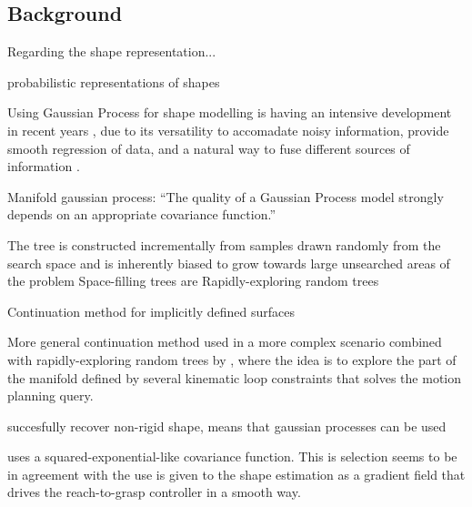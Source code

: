 \subsection{Background}
\label{sec:background}


Regarding the shape representation...

\citet{Faria2010Probabilistic} probabilistic representations of shapes

Using Gaussian Process for shape modelling is having an intensive development in recent years \citep{Mahler2015Grasp,Rosales2014Active,Bjorkman2013Enhancing,Dragiev2011Gaussian}, due to its versatility to accomadate noisy information, provide smooth regression of data, and a natural way to fuse different sources of information \citep{Rasmussen2006Gaussian}.

Manifold gaussian process: \citet{Calandra2014Manifold} ``The quality of a Gaussian Process model strongly depends on an appropriate covariance function.''

The tree is constructed incrementally from samples drawn randomly from the search space and is inherently biased to grow towards large unsearched areas of the problem
Space-filling trees are
Rapidly-exploring random trees \citet{LaValle2011Motion}

Continuation method for implicitly defined surfaces \citet{Henderson1993COMPUTING}

More general continuation method used in a more complex scenario combined with rapidly-exploring random trees \citep{LaValle2011Motion} by \citet{Jaillet2013Path}, where the idea is to explore the part of the manifold defined by several kinematic loop constraints that solves the motion planning query.

\citet{Zhu2009Nonrigid} succesfully recover non-rigid shape, means that gaussian processes can be used

\citet{Dragiev2011Gaussian} uses a squared-exponential-like covariance function. This is selection seems to be in agreement with the use is given to the shape estimation as a gradient field that drives the reach-to-grasp controller in a smooth way.

